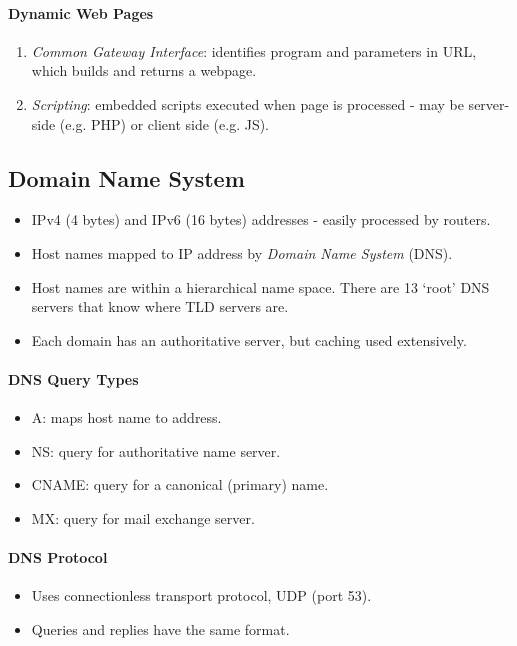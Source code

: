 \documentclass[twocolumn,english]{article}
\begin{document}
\paragraph{Dynamic Web Pages}
\begin{enumerate}
\item \emph{Common Gateway Interface}: identifies program and parameters
in URL, which builds and returns a webpage.
\item \emph{Scripting}: embedded scripts executed when page is processed
- may be server-side (e.g. PHP) or client side (e.g. JS).
\end{enumerate}

\subsection{Domain Name System}
\begin{itemize}
\item IPv4 (4 bytes) and IPv6 (16 bytes) addresses - easily processed by
routers.
\item Host names mapped to IP address by \emph{Domain Name System} (DNS).
\item Host names are within a hierarchical name space. There are 13 `root'
DNS servers that know where TLD servers are.
\item Each domain has an authoritative server, but caching used extensively.
\end{itemize}

\paragraph{DNS Query Types}
\begin{itemize}
\item A: maps host name to address.
\item NS: query for authoritative name server.
\item CNAME: query for a canonical (primary) name.
\item MX: query for mail exchange server.
\end{itemize}

\paragraph{DNS Protocol}
\begin{itemize}
\item Uses connectionless transport protocol, UDP (port 53).
\item Queries and replies have the same format.
\end{itemize}
\end{document}
